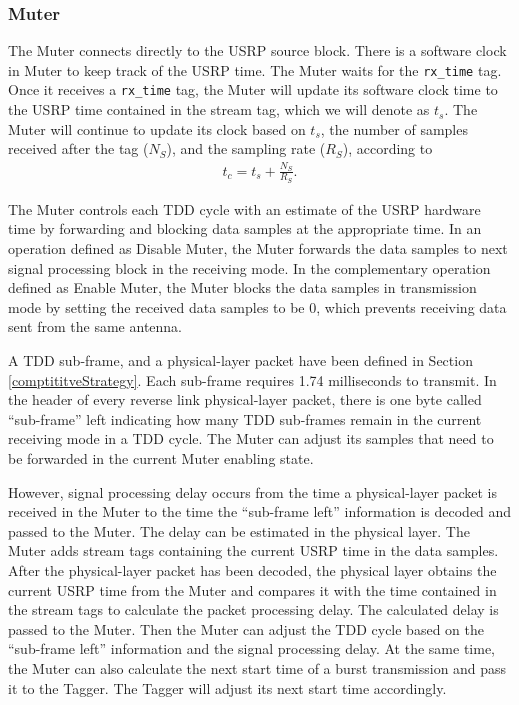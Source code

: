 \subsubsection{Muter}
The Muter connects directly to the USRP source block. There is a software clock in Muter to keep track of the USRP time. The Muter waits for the \texttt{rx\_time} tag. Once it receives a \texttt{rx\_time} tag, the Muter will update its software clock time to the USRP time contained in the stream tag, which we will denote as $t_s$. The Muter will continue to update its clock based on $t_s$, the number of samples received after the tag ($N_S$), and the sampling rate ($R_S$), according to
\begin{align}
{t_c} = {t_s} + \frac{{{N_S}}}{{{R_S}}}.
\end{align}

The Muter controls each TDD cycle with an estimate of the USRP hardware time by forwarding and blocking data samples at the appropriate time. In an operation defined as Disable Muter, the Muter forwards the data samples to next signal processing block in the receiving mode. In the complementary operation defined as Enable Muter, the Muter blocks the data samples in transmission mode by setting the received data samples to be 0, which prevents receiving data sent from the same antenna.

A TDD sub-frame, and a physical-layer packet have been defined in Section \ref{comptititveStrategy}. Each sub-frame requires 1.74 milliseconds to transmit. In the header of every reverse link physical-layer packet, there is one byte called ``sub-frame'' left indicating how many TDD sub-frames remain in the current receiving mode in a TDD cycle. The Muter can adjust its samples that need to be forwarded in the current Muter enabling state.

However, signal processing delay occurs from the time a physical-layer packet is received in the Muter to the time the ``sub-frame left'' information is decoded and passed to the Muter. The delay can be estimated in the physical layer. The Muter adds stream tags containing the current USRP time in the data samples. After the physical-layer packet has been decoded, the physical layer obtains the current USRP time from the Muter and compares it with the time contained in the stream tags to calculate the packet processing delay. The calculated delay is passed to the Muter. Then the Muter can adjust the TDD cycle based on the ``sub-frame left'' information and the signal processing delay. At the same time, the Muter can also calculate the next start time of a burst transmission and pass it to the Tagger. The Tagger will adjust its next start time accordingly.

